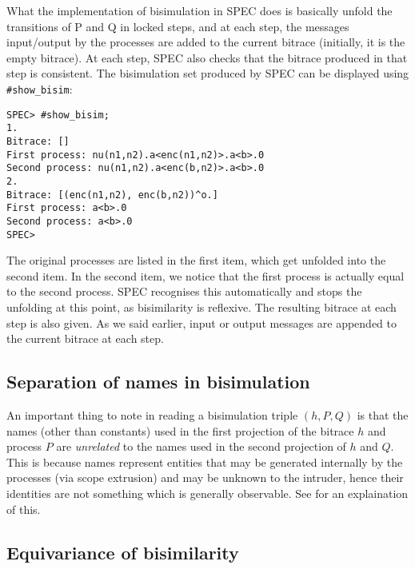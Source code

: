 \documentclass{article}
\begin{document}
What the implementation of bisimulation in SPEC does is basically
unfold the transitions of P and Q in locked steps, and at each step, the 
messages input/output by the processes are added to the current bitrace (initially,
it is the empty bitrace). At each step, SPEC also checks that the bitrace produced
in that step is consistent. 
The bisimulation set produced by SPEC can be displayed using \texttt{\#show\_bisim}:
\begin{verbatim}
SPEC> #show_bisim;
1. 
Bitrace: []
First process: nu(n1,n2).a<enc(n1,n2)>.a<b>.0
Second process: nu(n1,n2).a<enc(b,n2)>.a<b>.0
2. 
Bitrace: [(enc(n1,n2), enc(b,n2))^o.]
First process: a<b>.0
Second process: a<b>.0
SPEC> 
\end{verbatim}
The original processes are listed in the first item, which get unfolded into the second
item. In the second item, we notice that the first process is actually equal to the second
process. SPEC recognises this automatically and stops the unfolding at this point, as 
bisimilarity is reflexive. 
The resulting bitrace at each step is also given.
As we said earlier, input or output messages are appended to the current bitrace at each
step. 

\subsection{Separation of names in bisimulation}

An important thing to note in reading a bisimulation triple $(h,P,Q)$ is that
the names (other than constants) used in the first projection of the bitrace $h$
and process $P$ are {\em unrelated} to the names used in the second projection of $h$
and $Q$. This is because names represent entities that may be generated internally
by the processes (via scope extrusion) and may be unknown to the intruder, hence their
identities are not something which is generally observable. 
See \cite{abadi98njc} for an explaination of this. 

\subsection{Equivariance of bisimilarity}
\end{document}
